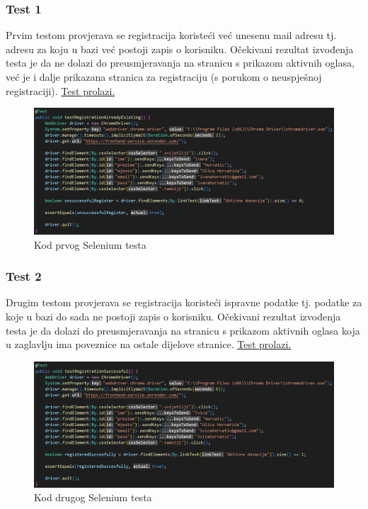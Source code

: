                \subsubsection{Test 1}
                Prvim testom provjerava se registracija koristeći već unesenu mail adresu tj. adresu za koju u bazi već postoji zapis o korisniku. Očekivani rezultat izvođenja testa je da ne dolazi do preusmjeravanja na stranicu s prikazom aktivnih oglasa, već je i dalje prikazana stranica za registraciju (s porukom o neuspješnoj registraciji). \underline{Test prolazi.}

                \begin{figure}[H]
				\includegraphics[scale=0.55]{slike/selenium1.png}
				\centering
				\caption{Kod prvog Selenium testa}
				\label{fig:selenium1}
			\end{figure}

                \subsubsection{Test 2}
                Drugim testom provjerava se registracija koristeći ispravne podatke tj. podatke za koje u bazi do sada ne postoji zapis o korisniku. Očekivani rezultat izvođenja testa je da dolazi do preusmjeravanja na stranicu s prikazom aktivnih oglasa koja u zaglavlju ima poveznice na ostale dijelove stranice. \underline{Test prolazi.}

                \begin{figure}[H]
				\includegraphics[scale=0.55]{slike/selenium2.png}
				\centering
				\caption{Kod drugog Selenium testa}
				\label{fig:selenium2}
			\end{figure}

